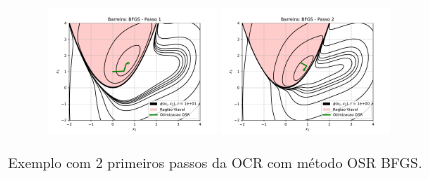 \documentclass[10pt, a4paper]{article}
\begin{document}
\begin{figure}[H]
  \centering
  \begin{subfigure}[b]{\textwidth}
    \includegraphics[width=0.49\textwidth]{fig_p1/Barreira_BFGS_1.pdf}
    \includegraphics[width=0.49\textwidth]{fig_p1/Barreira_BFGS_2.pdf}
  \end{subfigure}
  \caption{Exemplo com 2 primeiros passos da OCR com método OSR BFGS. }
\end{figure}
\end{document}
